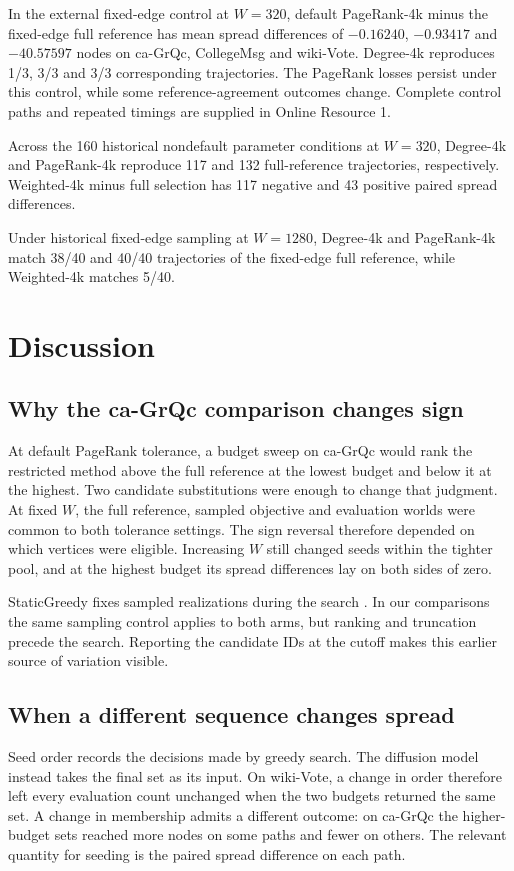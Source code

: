 \documentclass[smallextended]{svjour3}
\begin{document}
In the external fixed-edge control at $W=320$, default PageRank-4k minus the fixed-edge full reference has mean spread differences of $-0.16240$, $-0.93417$ and $-40.57597$ nodes on ca-GrQc, CollegeMsg and wiki-Vote. Degree-4k reproduces 1/3, 3/3 and 3/3 corresponding trajectories. The PageRank losses persist under this control, while some reference-agreement outcomes change. Complete control paths and repeated timings are supplied in Online Resource 1.

Across the 160 historical nondefault parameter conditions at $W=320$, Degree-4k and PageRank-4k reproduce 117 and 132 full-reference trajectories, respectively. Weighted-4k minus full selection has 117 negative and 43 positive paired spread differences.

Under historical fixed-edge sampling at $W=1280$, Degree-4k and PageRank-4k match 38/40 and 40/40 trajectories of the fixed-edge full reference, while Weighted-4k matches 5/40.
\FloatBarrier

\section{Discussion}
\subsection{Why the ca-GrQc comparison changes sign}
At default PageRank tolerance, a budget sweep on ca-GrQc would rank the restricted method above the full reference at the lowest budget and below it at the highest. Two candidate substitutions were enough to change that judgment. At fixed $W$, the full reference, sampled objective and evaluation worlds were common to both tolerance settings. The sign reversal therefore depended on which vertices were eligible. Increasing $W$ still changed seeds within the tighter pool, and at the highest budget its spread differences lay on both sides of zero.

StaticGreedy fixes sampled realizations during the search \cite{ref8}. In our comparisons the same sampling control applies to both arms, but ranking and truncation precede the search. Reporting the candidate IDs at the cutoff makes this earlier source of variation visible.

\subsection{When a different sequence changes spread}
Seed order records the decisions made by greedy search. The diffusion model instead takes the final set as its input. On wiki-Vote, a change in order therefore left every evaluation count unchanged when the two budgets returned the same set. A change in membership admits a different outcome: on ca-GrQc the higher-budget sets reached more nodes on some paths and fewer on others. The relevant quantity for seeding is the paired spread difference on each path.
\end{document}
